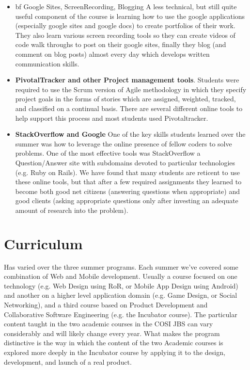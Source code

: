 \documentclass{sig-alternate}
\begin{document}
\begin{itemize}
\item {bf Google Sites, ScreenRecording, Blogging} A less technical, but still quite useful component of the course is learning how to use the google applications (especially google sites and google docs) to create portfolios of their work. They also learn various screen recording tools so they can create videos of code walk throughs to post on their google sites, finally they blog (and comment on blog posts) almost every day which develops written communication skills.
\item {\bf PivotalTracker and other Project management tools}. Students were required to use the Scrum version of Agile methodology in which they specify project goals in the forms of stories which are assigned, weighted, tracked, and classified on a continual basis. There are several different online tools to help support this process and most students used Pivotaltracker.
\item {\bf StackOverflow and Google} One of the key skills students learned over the summer was how to leverage the online presence of fellow coders to solve problems. One of the most effective tools was StackOverflow a Question/Answer site with subdomains devoted to particular technologies (e.g. Ruby on Rails). We have found that many students are reticent to use these online tools, but that after a few required assignments they learned to become both good net citizens (answering questions when appropriate) and good clients (asking appropriate questions only after investing an adequate amount of research into the problem).
\end{itemize}

\section{Curriculum}
Has varied over the three summer programs. Each summer we've
covered some combination of Web and Mobile development. Usually
a course focused on one technology (e.g. Web Design using RoR, or Mobile App Design using Android) and another
on a higher level application domain (e.g. Game Design, or Social Networking),
and a third course based on Product Development and Collaborative Software
Engineering (e.g. the Incubator course). The particular content taught in the two academic courses in the COSI JBS can vary considerably and will likely change every year. What makes the program distinctive is the way in which the content of the two Academic courses is explored more deeply in the Incubator course by applying it to the design, development, and launch of a real product.
\end{document}
